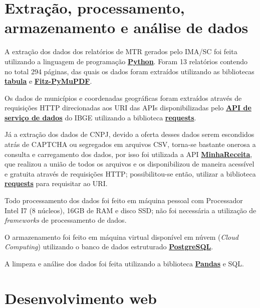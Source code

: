 \section{Extração, processamento, armazenamento e análise de dados}

A extração dos dados dos relatórios de \gls{MTR} gerados pelo \gls{IMA/SC} foi feita utilizando a linguagem de programação \href{https://www.python.org/}{\textbf{Python}}. Foram 13 relatórios contendo no total 294 páginas, das quais os dados foram extraídos utilizando as bibliotecas \href{https://tabula.technology/}{\textbf{tabula}} e \href{https://pymupdf.readthedocs.io/en/latest/}{\textbf{Fitz-PyMuPDF}}.

Os dados de municípios e coordenadas geográficas foram extraídos através de requisições \gls{HTTP} direcionadas aos \gls{URI} das \gls{API}s disponibilizadas pelo \href{https://servicodados.ibge.gov.br/api/docs/}{\textbf{\gls{API} de serviço de dados}} do \gls{IBGE} utilizando a biblioteca \href{https://pypi.org/project/requests/}{\textbf{requests}}.

Já a extração dos dados de \gls{CNPJ}, devido a oferta desses dados serem escondidos atrás de \gls{CAPTCHA} ou segregados em arquivos \gls{CSV}, torna-se bastante onerosa a consulta e carregamento dos dados, por isso foi utilizada a \gls{API} \href{https://docs.minhareceita.org/}{\textbf{MinhaReceita}}, que realizou a união de todos os arquivos e os disponibilizou de maneira acessível e gratuita através de requisições \gls{HTTP}; possibilitou-se então, utilizar a biblioteca \href{https://pypi.org/project/requests/}{\textbf{requests}} para requisitar ao \gls{URI}.

Todo processamento dos dados foi feito em máquina pessoal com Processador Intel I7 (8 núcleos), 16GB de \gls{RAM} e disco \gls{SSD}; não foi necessária a utilização de \textit{frameworks} de processamento de dados.

O armazenamento foi feito em máquina virtual disponível em núvem (\textit{Cloud Computing}) utilizando o banco de dados estruturado \href{https://www.postgresql.org/}{\textbf{PostgreSQL}}.

A limpeza e análise dos dados foi feita utilizando a biblioteca \href{https://pandas.pydata.org/}{\textbf{Pandas}} e \gls{SQL}.

\section{Desenvolvimento web}

